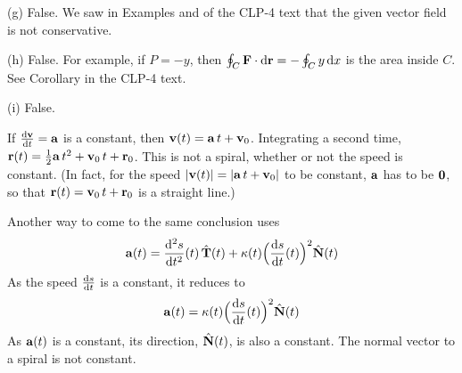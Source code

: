 \begin{solution}
\noindent (g) False. We saw in Examples 
 and
 of the CLP-4 text that the given vector 
field is not conservative. 

\noindent (h) False. For example, if $P=-y$, then 
$\oint_C\mathbf{F}\cdot\mathrm{d}\mathbf{r}=-\oint_C y\,\mathrm{d}x$
is the area inside $C$. See Corollary 
in the CLP-4 text.

\noindent (i) False. 

If $\diff{\vv}{t}=\va$ is a constant, then
$\mathbf{v}(t) =\mathbf{a}\, t+\mathbf{v}_0$. Integrating a second time,
$\mathbf{r}(t) = \frac{1}{2}\mathbf{a}\,t^2 +\mathbf{v}_0\, t+\mathbf{r}_0$. This is not a spiral,
whether or not the speed is constant. (In fact, for the speed $|\mathbf{v}(t)|
=|\mathbf{a}\, t+\mathbf{v}_0|$ to be constant, $\mathbf{a}$ has to be $\mathbf{0}$,
so that $\mathbf{r}(t) = \mathbf{v}_0\, t+\mathbf{r}_0$ is a straight line.)

Another way to come to the same conclusion uses
\begin{equation*}
\va(t)=\difftwo{s}{t}(t)\,\hat\vT(t)
                             +\ka(t)\Big(\diff{s}{t}(t)\Big)^2\hat\vN(t)
\end{equation*}
As the speed $\diff{s}{t}$ is a constant, it reduces to 
\begin{equation*}
\va(t)=\ka(t)\Big(\diff{s}{t}(t)\Big)^2\hat\vN(t)
\end{equation*}
As $\mathbf{a}(t)$ is a constant, its direction, $\hat{\mathbf{N}}(t)$, is also
a constant. The normal vector to a spiral is not constant.
\end{solution}

